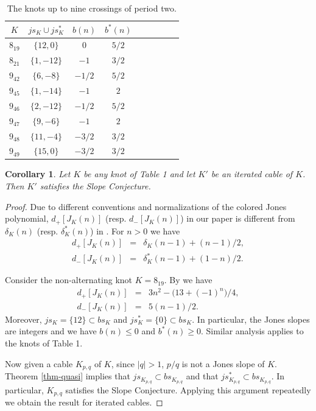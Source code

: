 \documentclass[11pt]{amsart}
\newtheorem{corollary}[theorem]{Corollary}
\theoremstyle{definition}
\newcommand{\K}{{K_{p, q}}}
\newcommand{\abs}[1]{{\left\vert #1 \right\vert}}
\begin{document}
\begin{table}[]
\begin{center}
\begin{tabular}{|c|c|c|c|c|c|c|c|c|}
\hline
$K$& $js_K \cup js^*_K $ & $b(n)$ & $b^*(n)$ \\
\hline
$8_{19}$ &$ \{12,0\}$ &  $0$ & $5/2$ \\
\hline
$8_{21}$ & $\{1,-12\}$ & $-1$ & $3/2$ \\
\hline
$9_{42}$  & $\{6,-8\}$ & $-1/2$ & $5/2$ \\
\hline
$9_{45}$  & $ \{1,-14\}$ & $-1$ & $2$ \\
\hline
$9_{46}$  & $ \{2,-12\}$ & $-1/2$ & $5/2$ \\
\hline
$9_{47}$  & $ \{9,-6\}$ & $-1$ & $2$\\
\hline
$9_{48}$ & $\{11,-4\}$ & $-3/2$ & $3/2$\\
\hline
$9_{49}$ & $ \{15,0\}$ & $-3/2$ & $3/2$\\
\hline
 \end{tabular}
\vskip 0.3in 
\caption{ The knots up to nine crossings of period two.}

\end{center}
\end{table}
\begin{corollary} \label{low} Let $K$ be any knot of Table 1 and let $K'$ be an iterated cable of $K$.
Then $K'$ satisfies the Slope Conjecture.
\end{corollary}

\begin{proof}
Due to different conventions and normalizations of the colored Jones polynomial, $d_+[J_K(n)]$ (resp. $d_-[J_K(n)]$) in our paper is different from $\delta_K(n)$ (resp. $\delta_K^*(n)$) in \cite{Ga-slope}. For $n>0$ we have
\begin{eqnarray*}
d_+[J_K(n)] &=&  \delta_K(n-1) + (n-1)/2,\\
d_-[J_K(n)] &=&  \delta_K^*(n-1) + (1-n)/2.
\end{eqnarray*}
 
Consider the non-alternating knot $K=8_{19}$. By \cite[Section 4]{Ga-slope} we have
\begin{eqnarray*}
d_+[J_K(n)] &=& 3n^2-\big( 13+(-1)^n \big)/4,\\
d_-[J_K(n)] &=& 5(n-1)/2.
\end{eqnarray*} 
Moreover, $js_K = \{12\} \subset bs_K$ and $js^*_K = \{0\} \subset bs_K$.  In particular, the Jones slopes are integers and we have
$b(n) \le 0$ and $b^{*}(n) \ge 0$.  Similar analysis applies to the knots of Table 1.

Now given a cable $\K$ of $K$, since $\abs{q}>1$, $p/q$ is not a Jones slope of $K$.
 Theorem \ref{thm-quasi}  implies that $js_{\K} \subset bs_{\K}$  and that $js^*_{\K} \subset bs_{\K}$. In particular, $\K$ satisfies the Slope Conjecture. Applying this argument repeatedly we obtain the result for iterated cables.
\end{proof}
\end{document}
